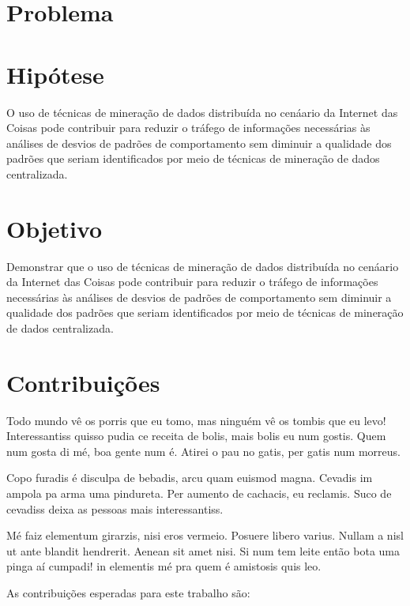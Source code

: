 \section{Problema} \label{sec:problema}


\section{Hipótese} \label{sec:hipotese}
\begin{hipo}
O uso de técnicas de mineração de dados distribuída no cenáario da Internet das Coisas pode contribuir para reduzir o tráfego de informações necessárias às análises de desvios de padrões de comportamento sem diminuir a qualidade dos padrões que seriam identificados por meio de técnicas de mineração de dados centralizada.\end{hipo}

\section{Objetivo} \label{sec:obj}
Demonstrar que o uso de técnicas de mineração de dados distribuída no cenáario da Internet das Coisas pode contribuir para reduzir o tráfego de informações necessárias às análises de desvios de padrões de comportamento sem diminuir a qualidade dos padrões que seriam identificados por meio de técnicas de mineração de dados centralizada.

\section{Contribuições} \label{sec:contrib}
Todo mundo vê os porris que eu tomo, mas ninguém vê os tombis que eu levo! Interessantiss quisso pudia ce receita de bolis, mais bolis eu num gostis. Quem num gosta di mé, boa gente num é. Atirei o pau no gatis, per gatis num morreus.

Copo furadis é disculpa de bebadis, arcu quam euismod magna. Cevadis im ampola pa arma uma pindureta. Per aumento de cachacis, eu reclamis. Suco de cevadiss deixa as pessoas mais interessantiss.

Mé faiz elementum girarzis, nisi eros vermeio. Posuere libero varius. Nullam a nisl ut ante blandit hendrerit. Aenean sit amet nisi. Si num tem leite então bota uma pinga aí cumpadi! in elementis mé pra quem é amistosis quis leo. 

As contribui\c{c}\~{o}es esperadas para este trabalho s\~{a}o:

